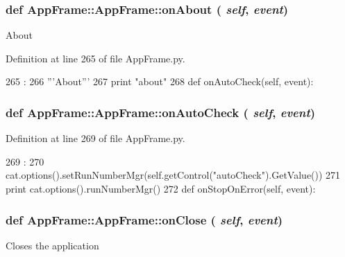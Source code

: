 \hypertarget{classAppFrame_1_1AppFrame_a8a7202f9eb527cf4513d8b69b385a172}{
\subsubsection[{onAbout}]{\setlength{\rightskip}{0pt plus 5cm}def AppFrame::AppFrame::onAbout ( {\em self}, \/   {\em event})}}
\label{classAppFrame_1_1AppFrame_a8a7202f9eb527cf4513d8b69b385a172}
\begin{DoxyVerb}About\end{DoxyVerb}
 

Definition at line 265 of file AppFrame.py.


\begin{DoxyCode}
265                             :
266         '''About'''
267         print "about"
268 
    def onAutoCheck(self, event):
\end{DoxyCode}
\hypertarget{classAppFrame_1_1AppFrame_ae06136b61e9fb8d5d8594a78bc5b1beb}{
\subsubsection[{onAutoCheck}]{\setlength{\rightskip}{0pt plus 5cm}def AppFrame::AppFrame::onAutoCheck ( {\em self}, \/   {\em event})}}
\label{classAppFrame_1_1AppFrame_ae06136b61e9fb8d5d8594a78bc5b1beb}


Definition at line 269 of file AppFrame.py.


\begin{DoxyCode}
269                                 :
270         cat.options().setRunNumberMgr(self.getControl("autoCheck").GetValue())
271         print cat.options().runNumberMgr()
272         
    def onStopOnError(self, event):
\end{DoxyCode}
\hypertarget{classAppFrame_1_1AppFrame_a5f83beacf1c4e5bd2a27e3c778c96c1e}{
\subsubsection[{onClose}]{\setlength{\rightskip}{0pt plus 5cm}def AppFrame::AppFrame::onClose ( {\em self}, \/   {\em event})}}
\label{classAppFrame_1_1AppFrame_a5f83beacf1c4e5bd2a27e3c778c96c1e}
\begin{DoxyVerb}Closes the application\end{DoxyVerb}
 

